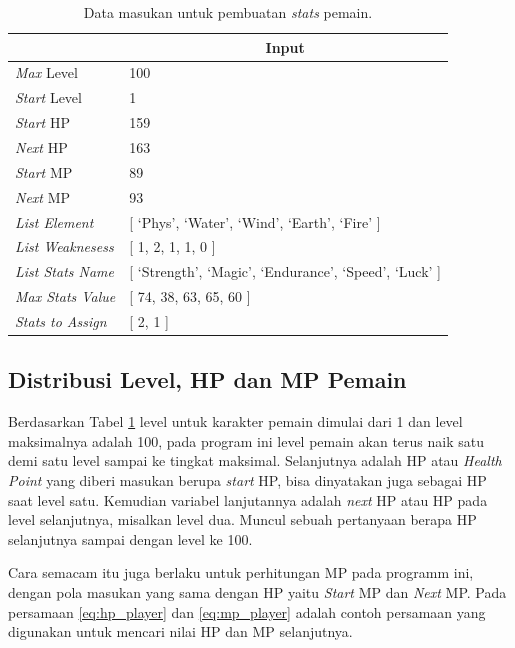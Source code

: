 \begin{longtable}{|l|l|}
	\caption{Data masukan untuk pembuatan \textit{stats} pemain.}
	\label{tb:player_input_variable}\\
	\hline
	\rowcolor[HTML]{9B9B9B} 
	\multicolumn{1}{|c|}{\cellcolor[HTML]{9B9B9B}\textbf{Variabel}} & \multicolumn{1}{c|}{\cellcolor[HTML]{9B9B9B}\textbf{Input}} \\ \hline
	\textit{Max} Level & 100 \\ \hline
	\textit{Start} Level & 1 \\ \hline
	\textit{Start} HP & 159 \\ \hline
	\textit{Next} HP & 163 \\ \hline
	\textit{Start} MP & 89 \\ \hline
	\textit{Next} MP & 93 \\ \hline
	\textit{List Element} & {[} `Phys', `Water', `Wind', `Earth', `Fire' {]} \\ \hline
	\textit{List Weaknesess} & {[} 1, 2, 1, 1, 0 {]} \\ \hline
	\textit{List Stats Name} & {[} `Strength', `Magic', `Endurance', `Speed', `Luck' {]} \\ \hline
	\textit{Max Stats Value} & {[} 74, 38, 63, 65, 60 {]} \\ \hline
	\textit{Stats to Assign} & {[} 2, 1 {]} \\ \hline
\end{longtable}
\vspace{-1ex}

\subsection{Distribusi Level, HP dan MP Pemain}
\label{sec:sub_sec3_player_level_hp_mp}
\vspace{1ex}

Berdasarkan Tabel \ref{tb:player_input_variable} level untuk karakter pemain dimulai dari 1 dan level maksimalnya adalah 100, pada program ini level pemain akan terus naik satu demi satu level sampai ke tingkat maksimal. Selanjutnya adalah HP atau \textit{Health Point} yang diberi masukan berupa \textit{start} HP, bisa dinyatakan juga sebagai HP saat level satu. Kemudian variabel lanjutannya adalah \textit{next} HP atau HP pada level selanjutnya, misalkan level dua. Muncul sebuah pertanyaan berapa HP selanjutnya sampai dengan level ke 100. 
\vspace{1ex}

Cara semacam itu juga berlaku untuk perhitungan MP pada programm ini, dengan pola masukan yang sama dengan HP yaitu \textit{Start} MP dan \textit{Next} MP. Pada persamaan \ref{eq:hp_player} dan \ref{eq:mp_player} adalah contoh persamaan yang digunakan untuk mencari nilai HP dan MP selanjutnya.
\vspace{1ex}

